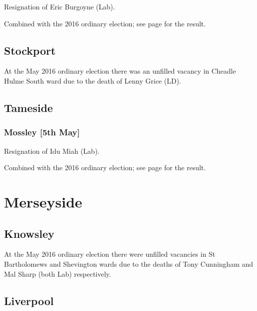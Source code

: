 \documentclass[a4paper,openany]{book}
\begin{document}
\begin{resultsiii}

Resignation of Eric Burgoyne (Lab).

Combined with the 2016 ordinary election; see page \pageref{LittleHultonSalford} for the result.

\subsection*{Stockport}

At the May 2016 ordinary election there was an unfilled vacancy in Cheadle Hulme South ward due to the death of Lenny Grice (LD).

\subsection*{Tameside}

\subsubsection*{Mossley \hspace*{\fill}\nolinebreak[1]%
\enspace\hspace*{\fill}
[5th May]}


Resignation of Idu Miah (Lab).

Combined with the 2016 ordinary election; see page \pageref{MossleyTameside} for the result.

\section{Merseyside}

\subsection*{Knowsley}

At the May 2016 ordinary election there were unfilled vacancies in St Bartholomews and Shevington wards due to the deaths of Tony Cunningham and Mal Sharp (both Lab) respectively.%
%

\subsection*{Liverpool}


\end{resultsiii}
\end{document}
